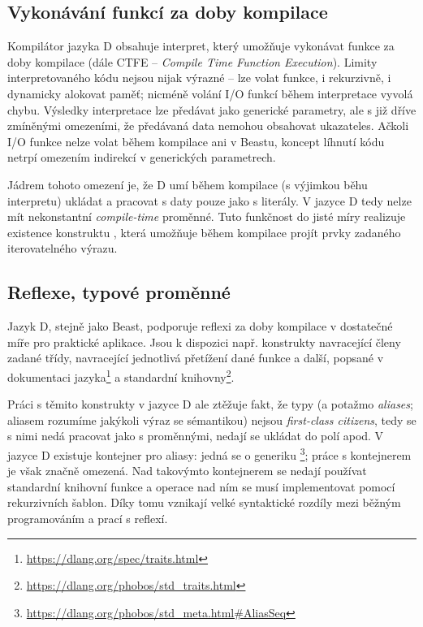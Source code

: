 \subsection{Vykonávání funkcí za doby kompilace}
Kompilátor jazyka D obsahuje interpret, který umožňuje vykonávat funkce za doby kompilace (dále CTFE -- \textit{Compile Time Function Execution}). Limity interpretovaného kódu nejsou nijak výrazné -- lze volat funkce, i rekurzivně, i dynamicky alokovat paměť; nicméně volání I/O funkcí během interpretace vyvolá chybu. Výsledky interpretace lze předávat jako generické parametry, ale s již dříve zmíněnými omezeními, že předávaná data nemohou obsahovat ukazateles. Ačkoli I/O funkce nelze volat během kompilace ani v Beastu, koncept líhnutí kódu netrpí omezením indirekcí v generických parametrech.

Jádrem tohoto omezení je, že D umí během kompilace (s výjimkou běhu interpretu) ukládat a pracovat s daty pouze jako s literály. V jazyce D tedy nelze mít nekonstantní \textit{compile-time} proměnné. Tuto funkčnost do jisté míry realizuje existence konstruktu , která umožňuje během kompilace projít prvky zadaného iterovatelného výrazu.

\subsection{Reflexe, typové proměnné}
Jazyk D, stejně jako Beast, podporuje reflexi za doby kompilace v dostatečné míře pro praktické aplikace. Jsou k dispozici např. konstrukty  navracející členy zadané třídy,  navracející jednotlivá přetížení dané funkce a další, popsané v dokumentaci jazyka\footnote{\url{https://dlang.org/spec/traits.html}} a standardní knihovny\footnote{\url{https://dlang.org/phobos/std_traits.html}}.

Práci s těmito konstrukty v jazyce D ale ztěžuje fakt, že typy (a potažmo \textit{aliases}; aliasem rozumíme jakýkoli výraz se sémantikou) nejsou \textit{first-class citizens}, tedy se s nimi nedá pracovat jako s proměnnými, nedají se ukládat do polí apod. V jazyce D existuje kontejner pro aliasy: jedná se o generiku \footnote{\url{https://dlang.org/phobos/std_meta.html\#AliasSeq}}; práce s kontejnerem  je však značně omezená. Nad takovýmto kontejnerem se nedají používat standardní knihovní funkce a operace nad ním se musí implementovat pomocí rekurzivních šablon. Díky tomu vznikají velké syntaktické rozdíly mezi běžným programováním a prací s reflexí.

